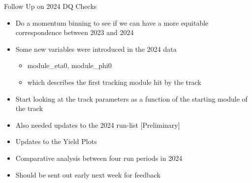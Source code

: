 \begin{frame}{Follow Up on 2024 DQ Checks}
    \begin{itemize}
        \item Do a momentum binning to see if we can have a more equitable correspondence between 2023 and 2024
        \item Some new variables were introduced in the 2024 data
        \begin{itemize}
            \item module\_eta0, module\_phi0 
            \item which describes the first tracking module hit by the track
        \end{itemize}
    \item Start looking at the track parameters as a function of the starting module of the track
    \item Also needed updates to the 2024 run-list [Preliminary]
    \item Updates to the Yield Plots 
    \item Comparative analysis between four run periods in 2024
    \item Should be sent out early next week for feedback
    \end{itemize}
\end{frame}



